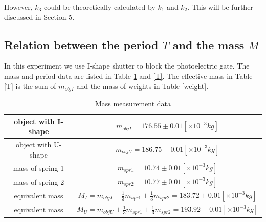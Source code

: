     However, $k_3$ could be theoretically calculated by $k_1$ and $k_2$. This will be further discussed in Section 5.\\

\subsection{Relation between the period $T$ and the mass $M$}
    In this experiment we use I-shape shutter to block the photoelectric gate. The mass and period data are listed in Table \ref{M} and \ref{T}. The effective mass in Table \ref{T} is the sum of $m_{objI}$ and the mass of weights in Table \ref{weight}.

    \begin{table}[h]
        \centering
        \begin{tabular}{|c|c|}
            \hline
            object with I-shape & $m_{objI}=176.55\pm 0.01[\times10^{-3}kg]$\\ \hline
            object with U-shape & $m_{objU}=186.75\pm 0.01[\times10^{-3}kg]$\\ \hline
            mass of spring 1 & $m_{spr1}=10.74\pm 0.01[\times10^{-3}kg]$\\ \hline
            mass of spring 2 & $m_{spr2}=10.77\pm 0.01[\times10^{-3}kg]$\\ \hline
            equivalent mass & $M_I=m_{objI}+\frac{1}{3}m_{spr1}+\frac{1}{3}m_{spr2}=183.72\pm 0.01[\times10^{-3}kg]$\\ \hline
            equivalent mass & $M_U=m_{objU}+\frac{1}{3}m_{spr1}+\frac{1}{3}m_{spr2}=193.92\pm 0.01[\times10^{-3}kg]$\\ \hline
        \end{tabular}
        \caption{Mass measurement data}\label{M}
    \end{table}
    \vspace{1cm}
